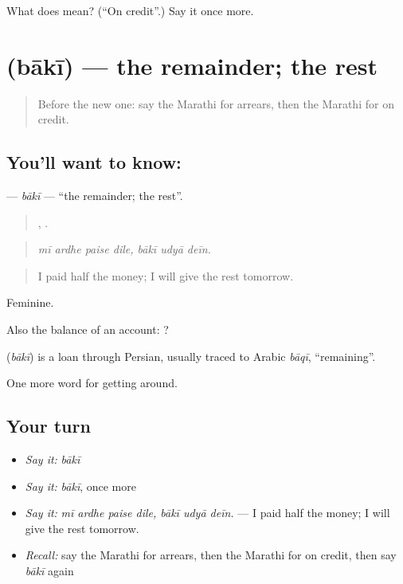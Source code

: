 \begin{tcolorbox}[breakable,colback=teal!4,colframe=teal!35!black,title={Before you move on}]
What does  mean? (\textquotedblleft{}On credit\textquotedblright{}.) Say it once more.
\end{tcolorbox}
\section[\texorpdfstring{\mr{बाकी} (bākī)}{बाकी (bākī)}]{ (bākī) — the remainder; the rest}

\label{lesson:MR-C427-baki}



\begin{quote}
Before the new one: say the Marathi for arrears, then the Marathi for on credit.
\end{quote}

\subsection*{You'll want to know: }
\textbf{} — \emph{bākī} — \textquotedblleft{}the remainder; the rest\textquotedblright{}.

\begin{quote}
   ,   .
\end{quote}

\begin{quote}
\emph{mī ardhe paise dile, bākī udyā deīn.}
\end{quote}

\begin{quote}
I paid half the money; I will give the rest tomorrow.
\end{quote}

Feminine.

Also the balance of an account:  ?

\begin{cousinweb}
\textbf{} (\emph{bākī}) is a loan through Persian, usually traced to Arabic \emph{bāqī}, \textquotedblleft{}remaining\textquotedblright{}.
\end{cousinweb}

\begin{grammarlens}[title={What you've built}]
One more word for getting around.
\end{grammarlens}

\subsection*{Your turn}
\begin{itemize}
\raggedright
  \item \emph{Say it:} \emph{bākī}
  \item \emph{Say it:} \emph{bākī}, once more
  \item \emph{Say it:} \emph{mī ardhe paise dile, bākī udyā deīn.} — I paid half the money; I will give the rest tomorrow.
  \item \emph{Recall:} say the Marathi for arrears, then the Marathi for on credit, then say \emph{bākī} again
\end{itemize}

